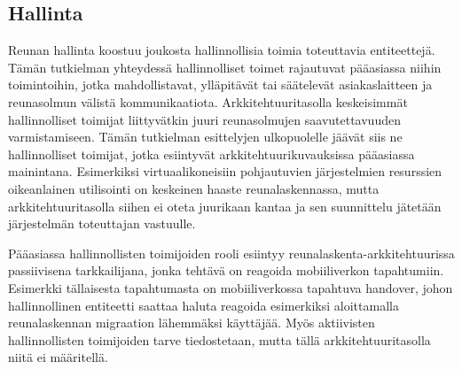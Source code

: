 \subsection{Hallinta}




Reunan hallinta koostuu joukosta hallinnollisia toimia toteuttavia entiteettejä. Tämän tutkielman yhteydessä hallinnolliset toimet rajautuvat pääasiassa niihin toimintoihin, jotka mahdollistavat, ylläpitävät tai säätelevät asiakaslaitteen ja reunasolmun välistä kommunikaatiota. Arkkitehtuuritasolla keskeisimmät hallinnolliset toimijat liittyvätkin juuri reunasolmujen saavutettavuuden varmistamiseen.
Tämän tutkielman esittelyjen ulkopuolelle jäävät siis ne hallinnolliset toimijat, jotka esiintyvät arkkitehtuurikuvauksissa pääasiassa mainintana. Esimerkiksi virtuaalikoneisiin pohjautuvien järjestelmien resurssien oikeanlainen utilisointi \cite{yousaf16fine, taleb2017multi} on keskeinen haaste reunalaskennassa, mutta arkkitehtuuritasolla siihen ei oteta juurikaan kantaa ja sen suunnittelu jätetään järjestelmän toteuttajan vastuulle.


Pääasiassa hallinnollisten toimijoiden rooli esiintyy reunalaskenta-arkkitehtuurissa passiivisena tarkkailijana, jonka tehtävä on reagoida mobiiliverkon tapahtumiin. 
Esimerkki tällaisesta tapahtumasta on mobiiliverkossa tapahtuva handover, johon hallinnollinen entiteetti saattaa haluta reagoida esimerkiksi aloittamalla reunalaskennan migraation lähemmäksi käyttäjää. 
Myös aktiivisten hallinnollisten toimijoiden tarve tiedostetaan, mutta tällä arkkitehtuuritasolla niitä ei määritellä.


